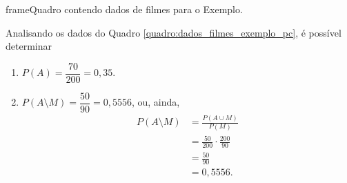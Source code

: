 \documentclass[11pt,fleqn]{book}
\numberwithin{mpicture}{chapter}
\numberwithin{mtable}{chapter}
\numberwithin{mframe}{chapter}
\begin{document}
\begin{pageWidthArea}
	\begin{pageWidthAreaPicture}{frame}{Quadro contendo dados de filmes para o Exemplo.}
		\label{quadro:dados_filmes_exemplo_pc}
		\hspace{-15pt}
	\end{pageWidthAreaPicture}
	
	\vspace{20pt}

	\begin{example}
		\begin{multicols}{2}
			Analisando os dados do Quadro \ref{quadro:dados_filmes_exemplo_pc}, é possível determinar\\
	
			\begin{enumerate}[label=\alph*), itemsep=10pt]
				\item $P(A)=\dfrac{70}{200}=0,35$.
		
				\item $P(A\setminus M)=\dfrac{50}{90}=0,5556$, ou, ainda,
				\begin{align*}
					P(A\setminus M)&=\frac{P(A\cup M)}{P(M)}\\
							&=\frac{50}{200}\cdot \frac{200}{90}\\
							&=\frac{50}{90}\\
							&=0,5556\text{.}
				\end{align*}
		

\end{enumerate}
\end{multicols}
\end{example}
\end{pageWidthArea}
\end{document}
